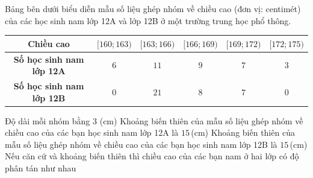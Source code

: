 \begin{ex}%
Bảng bên dưới biểu diễn mẫu số liệu ghép nhóm về chiều cao (đơn vị: centimét) của các học sinh nam lớp 12A và lớp 12B ở một trường trung học phổ thông.
\begin{center}
\begin{tabular}{|c|c|c|c|c|c|}
\hline
\textbf{Chiều cao} & $[160;163)$ & $[163; 166)$ & $[166;169)$ & $[169;172)$ & $[172;175)$\\
\hline
\textbf{Số học sinh nam lớp 12A} & $6$ & $11$ & $9$ & $7$ & $3$ \\
\hline
\textbf{Số học sinh nam lớp 12B} & $0$ & $21$ & $8$ & $7$ & $0$\\
\hline
\end{tabular}
\end{center}
\choiceTF
{\True Độ dài mỗi nhóm bằng $3$ (cm)}
{\True Khoảng biến thiên của mẫu số liệu ghép nhóm về chiều cao của các bạn học sinh nam lớp 12A là $15$\,(cm)}
{Khoảng biến thiên của mẫu số liệu ghép nhóm về chiều cao của các bạn học sinh nam lớp 12B là $15$\,(cm)}
{Nếu căn cứ và khoảng biến thiên thì chiều cao của các bạn nam ở hai lớp có độ phân tán như nhau}
\end{ex}

